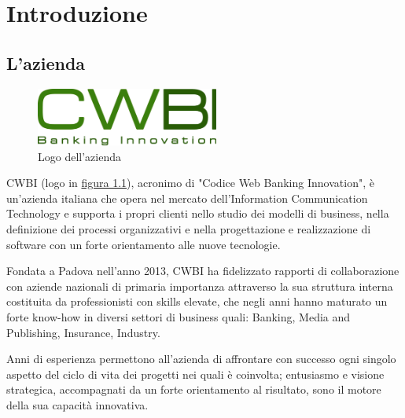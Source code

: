 \chapter{Introduzione}
\label{cap:introduzione}


\setlength{\parskip}{3ex}

\section{L'azienda}

\begin{figure}[!h]
	\centering
	\includegraphics[width=6cm]{../images/CWBI-logo.png}
	\caption{Logo dell'azienda}
	\label{fig:azienda}
\end{figure}

\setlength{\parskip}{3ex}

\noindent CWBI (logo in {\hyperref[fig:azienda]{figura 1.1}}), acronimo di "Codice Web Banking Innovation", è un’azienda italiana che opera nel mercato dell'Information Communication Technology e supporta i propri clienti nello studio dei modelli di business, nella definizione dei processi organizzativi e nella progettazione e realizzazione di software con un forte orientamento alle nuove tecnologie.

\setlength{\parskip}{3ex}

\noindent Fondata a Padova nell'anno 2013, CWBI ha fidelizzato rapporti di collaborazione con aziende nazionali di primaria importanza attraverso la sua struttura interna costituita da professionisti con skills elevate, che negli anni hanno maturato un forte know-how in diversi settori di business quali: Banking, Media and Publishing, Insurance, Industry.

\setlength{\parskip}{3ex}

\noindent Anni di esperienza permettono all'azienda di affrontare con successo ogni singolo aspetto del ciclo di vita dei progetti nei quali è coinvolta; entusiasmo e visione strategica, accompagnati da un forte orientamento al risultato, sono il motore della sua capacità innovativa.


